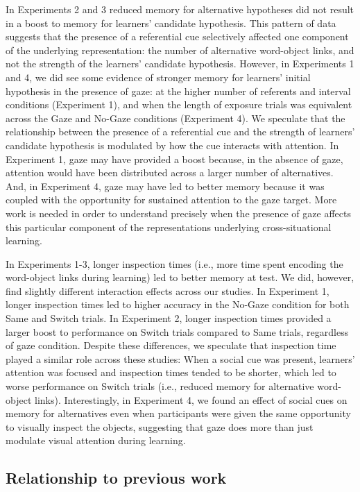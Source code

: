 \documentclass[oneside]{report}
\begin{document}
In Experiments 2 and 3 reduced memory for alternative hypotheses did not
result in a boost to memory for learners' candidate hypothesis. This
pattern of data suggests that the presence of a referential cue
selectively affected one component of the underlying representation: the
number of alternative word-object links, and not the strength of the
learners' candidate hypothesis. However, in Experiments 1 and 4, we did
see some evidence of stronger memory for learners' initial hypothesis in
the presence of gaze: at the higher number of referents and interval
conditions (Experiment 1), and when the length of exposure trials was
equivalent across the Gaze and No-Gaze conditions (Experiment 4). We
speculate that the relationship between the presence of a referential
cue and the strength of learners' candidate hypothesis is modulated by
how the cue interacts with attention. In Experiment 1, gaze may have
provided a boost because, in the absence of gaze, attention would have
been distributed across a larger number of alternatives. And, in
Experiment 4, gaze may have led to better memory because it was coupled
with the opportunity for sustained attention to the gaze target. More
work is needed in order to understand precisely when the presence of
gaze affects this particular component of the representations underlying
cross-situational learning.

In Experiments 1-3, longer inspection times (i.e., more time spent
encoding the word-object links during learning) led to better memory at
test. We did, however, find slightly different interaction effects
across our studies. In Experiment 1, longer inspection times led to
higher accuracy in the No-Gaze condition for both Same and Switch
trials. In Experiment 2, longer inspection times provided a larger boost
to performance on Switch trials compared to Same trials, regardless of
gaze condition. Despite these differences, we speculate that inspection
time played a similar role across these studies: When a social cue was
present, learners' attention was focused and inspection times tended to
be shorter, which led to worse performance on Switch trials (i.e.,
reduced memory for alternative word-object links). Interestingly, in
Experiment 4, we found an effect of social cues on memory for
alternatives even when participants were given the same opportunity to
visually inspect the objects, suggesting that gaze does more than just
modulate visual attention during learning.

\hypertarget{relationship-to-previous-work}{%
\subsection{Relationship to previous
work}\label{relationship-to-previous-work}}
\end{document}
